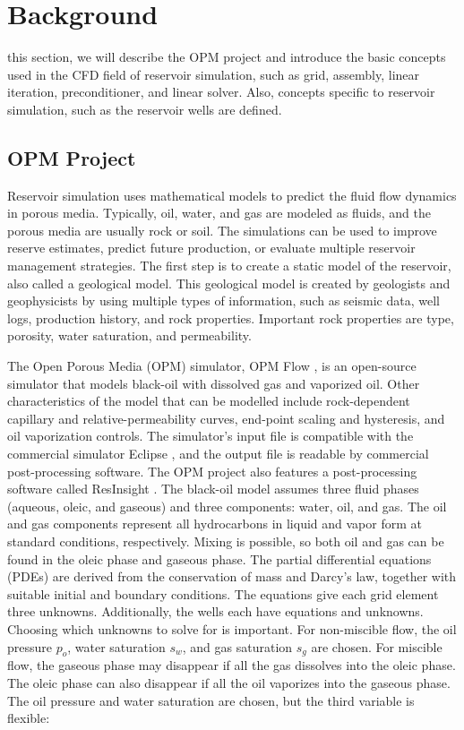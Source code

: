 \section{Background}
\label{sec:background}

 this section, we will describe the OPM project and introduce the basic concepts used in the CFD field of reservoir simulation, such as grid, assembly, linear iteration, preconditioner, and linear solver. Also, concepts specific to reservoir simulation, such as the reservoir wells are defined.

\subsection{OPM Project}

Reservoir simulation\cite{reservoir_sim1,reservoir_sim2} uses mathematical models to predict the fluid flow dynamics in porous media. Typically, oil, water, and gas are modeled as fluids, and the porous media are usually rock or soil. The simulations can be used to improve reserve estimates, predict future production, or evaluate multiple reservoir management strategies. The first step is to create a static model of the reservoir, also called a geological model. This geological model is created by geologists and geophysicists by using multiple types of information, such as seismic data, well logs, production history, and rock properties. Important rock properties are type, porosity, water saturation, and permeability.

The Open Porous Media (OPM) \cite{OPM} simulator, OPM Flow \cite{flow_paper}, is an open-source simulator that models black-oil \cite{blackoil_model} with dissolved gas and vaporized oil. Other characteristics of the model that can be modelled include rock-dependent capillary and relative-permeability curves, end-point scaling and hysteresis, and oil vaporization controls. The simulator's input file is compatible with the commercial simulator Eclipse \cite{eclipse}, and the output file is readable by commercial post-processing software. The OPM project also features a post-processing software called ResInsight \cite{resinsight}. The black-oil model assumes three fluid phases (aqueous, oleic, and gaseous) and three components: water, oil, and gas. The oil and gas components represent all hydrocarbons in liquid and vapor form at standard conditions, respectively. Mixing is possible, so both oil and gas can be found in the oleic phase and gaseous phase. The partial differential equations (PDEs) are derived from the conservation of mass and Darcy's law\cite{darcy_law1,darcy_law2}, together with suitable initial and boundary conditions. The equations give each grid element three unknowns. Additionally, the wells each have equations and unknowns. Choosing which unknowns to solve for is important. For non-miscible flow, the oil pressure $p_o$, water saturation $s_w$, and gas saturation $s_g$ are chosen. For miscible flow, the gaseous phase may disappear if all the gas dissolves into the oleic phase. The oleic phase can also disappear if all the oil vaporizes into the gaseous phase. The oil pressure and water saturation are chosen, but the third variable is flexible:

